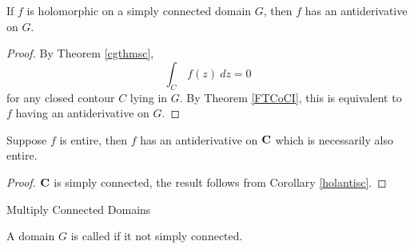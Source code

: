 \vspace*{1em}

\begin{corollary}\label{holantisc}
If $f$ is holomorphic on a simply connected domain $G$, then $f$ has an antiderivative on $G$.
\end{corollary}
\begin{proof}
By Theorem \ref{cgthmsc}, 
\[\int_C\,f(z)\ dz = 0\]
for any closed contour $C$ lying in $G$. By Theorem \ref{FTCoCI}, this is equivalent to $f$ having an antiderivative on $G$.
\end{proof}

\vspace*{1em}

\begin{corollary}
Suppose $f$ is entire, then $f$ has an antiderivative on $\mathbf C$ which is necessarily also entire.
\end{corollary}
\begin{proof}
$\mathbf C$ is simply connected, the result follows from Corollary \ref{holantisc}.
\end{proof}

\newpage

\begin{mdframed}
\begin{center}
{\Large Multiply Connected Domains}
\end{center}
\end{mdframed}

\begin{definition}
A domain $G$ is called  if it not simply connected.
\end{definition}

\vspace*{1em}

